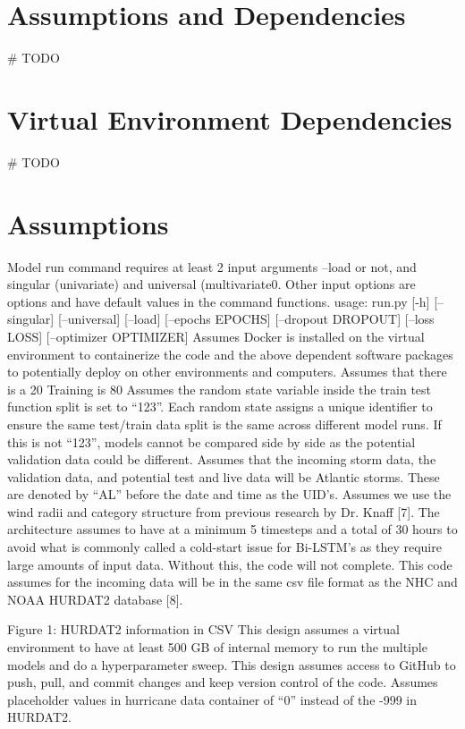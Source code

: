 \documentclass{article}
\begin{document}
\section{Assumptions and Dependencies}
\# TODO
\section{Virtual Environment Dependencies}
\# TODO

\section{Assumptions}
Model run command requires at least 2 input arguments –load or not, and singular (univariate) and universal (multivariate0. Other input options are options and have default values in the command functions.
usage: run.py [-h] [--singular] [--universal] [--load] [--epochs EPOCHS] [--dropout DROPOUT] [--loss LOSS] [--optimizer OPTIMIZER]
Assumes Docker is installed on the virtual environment to containerize the code and the above dependent software packages to potentially deploy on other environments and computers.
Assumes that there is a 20%
Training is 80%
Assumes the random state variable inside the train test function split is set to “123”. 
Each random state assigns a unique identifier to ensure the same test/train data split is the same across different model runs. If this is not “123”, models cannot be compared side by side as the potential validation data could be different. 
Assumes that the incoming storm data, the validation data, and potential test and live data will be Atlantic storms. These are denoted by “AL” before the date and time as the UID’s.
Assumes we use the wind radii and category structure from previous research by Dr. Knaff [7].
The architecture assumes to have at a minimum 5 timesteps and a total of 30 hours to avoid what is commonly called a cold-start issue for Bi-LSTM’s as they require large amounts of input data. Without this, the code will not complete.
This code assumes for the incoming data will be in the same csv file format as the NHC and NOAA HURDAT2 database [8].

Figure 1: HURDAT2 information in CSV
This design assumes a virtual environment to have at least 500 GB of internal memory to run the multiple models and do a hyperparameter sweep.
This design assumes access to GitHub to push, pull, and commit changes and keep version control of the code. 
Assumes placeholder values in hurricane data container of “0” instead of the -999 in HURDAT2.
\end{document}
